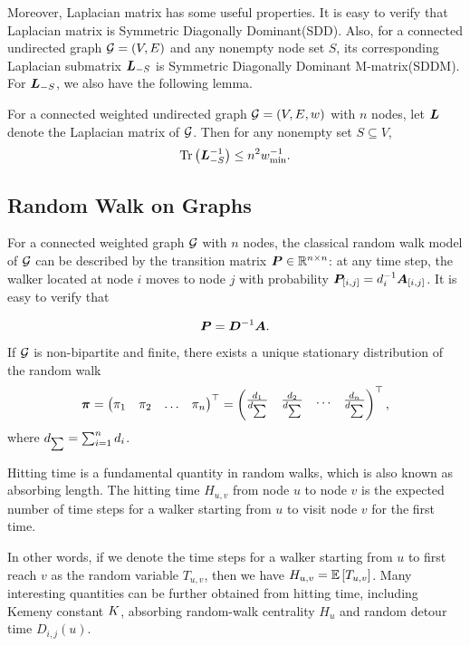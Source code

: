 \documentclass[sigconf]{acmart}
\begin{document}
Moreover, Laplacian matrix has some useful properties.
It is easy to verify that Laplacian matrix is Symmetric Diagonally Dominant(SDD).
Also, for a connected undirected graph \(\mathcal{G}=(V,E)\) and any nonempty node set \(S\), its corresponding Laplacian submatrix \(\boldsymbol{L}_{-S}\) is Symmetric Diagonally Dominant M-matrix(SDDM).
For \(\boldsymbol{L}_{-S}\), we also have the following lemma.
\begin{lemma}\label{lem:trace-lap}
    For a connected weighted undirected graph \(\mathcal{G}=(V,E,w)\) with \(n\) nodes, let \(\boldsymbol{L}\) denote the Laplacian matrix of \(\mathcal{G}\).
    Then for any nonempty set \(S\subseteq V\),
    \[\mathrm{Tr}\left(\boldsymbol{L}_{-S}^{-1}\right)\le n^2w_{\min}^{-1}.\]
\end{lemma}

\subsection{Random Walk on Graphs}\label{subsec:random-walk}

For a connected weighted graph \(\mathcal{G}\) with \(n\) nodes, the classical random walk model of \(\mathcal{G}\) can be described by the transition matrix \(\boldsymbol{P}\in\mathbb{R}^{n\times n}\): at any time step, the walker located at node \(i\) moves to node \(j\) with probability \({\boldsymbol{P}_{[i,j]}=d_i^{-1}\boldsymbol{A}_{[i,j]}}\).
It is easy to verify that

\begin{equation}\label{eq:trs}
    \boldsymbol{P}=\boldsymbol{D}^{-1}\boldsymbol{A}.
\end{equation}

If \(\mathcal{G}\) is non-bipartite and finite, there exists a unique stationary distribution of the random walk~\cite{Cv80}
\[
    \boldsymbol{\pi}=\begin{pmatrix}
        \pi_1 & \pi_2 & \dots & \pi_n
    \end{pmatrix}^\top=\begin{pmatrix}
        \frac{d_1}{d_{\sum}} & \frac{d_2}{d_{\sum}} & \dots & \frac{d_n}{d_{\sum}}
    \end{pmatrix}^\top,
\]
where \(d_{\sum}=\sum_{i=1}^nd_i\).

Hitting time is a fundamental quantity in random walks, which is also known as absorbing length.
The hitting time \(H_{u,v}\) from node \(u\) to node \(v\) is the expected number of time steps for a walker starting from \(u\) to visit node \(v\) for the first time.

In other words, if we denote the time steps for a walker starting from \(u\) to first reach \(v\) as the random variable \(T_{u,v}\), then we have \(H_{u,v}=\mathbb{E}\left[T_{u,v}\right]\).
Many interesting quantities can be further obtained from hitting time, including Kemeny constant \(K\), absorbing random-walk centrality \(H_u\) and random detour time \(D_{i,j}(u)\).
\end{document}
